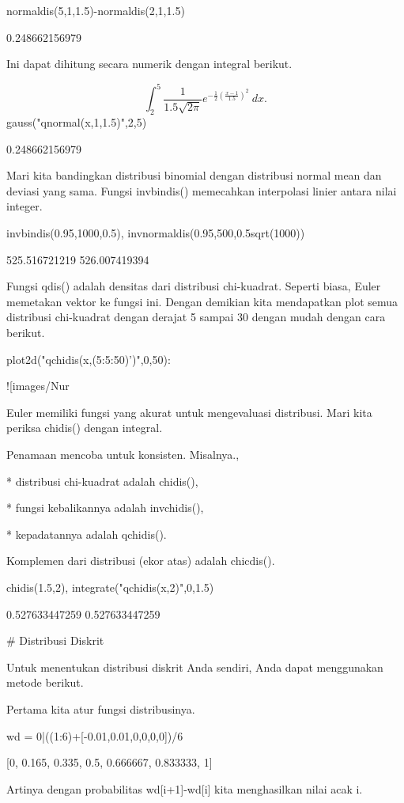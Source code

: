 \documentclass{article}
\begin{document}
\>normaldis(5,1,1.5)-normaldis(2,1,1.5)


    0.248662156979

Ini dapat dihitung secara numerik dengan integral berikut.


$$\int_2^5 \frac{1}{1.5\sqrt{2\pi}}e^{-\frac{1}{2}(\frac{x-1}{1.5})^2}\ dx.$$\>gauss("qnormal(x,1,1.5)",2,5)


    0.248662156979

Mari kita bandingkan distribusi binomial dengan distribusi normal mean
dan deviasi yang sama. Fungsi invbindis() memecahkan interpolasi
linier antara nilai integer.


\>invbindis(0.95,1000,0.5), invnormaldis(0.95,500,0.5\*sqrt(1000))


    525.516721219
    526.007419394

Fungsi qdis() adalah densitas dari distribusi chi-kuadrat. Seperti
biasa, Euler memetakan vektor ke fungsi ini. Dengan demikian kita
mendapatkan plot semua distribusi chi-kuadrat dengan derajat 5 sampai
30 dengan mudah dengan cara berikut.


\>plot2d("qchidis(x,(5:5:50)')",0,50):


![images/Nur%

Euler memiliki fungsi yang akurat untuk mengevaluasi distribusi. Mari
kita periksa chidis() dengan integral.


Penamaan mencoba untuk konsisten. Misalnya.,


* 
distribusi chi-kuadrat adalah chidis(),

* 
fungsi kebalikannya adalah invchidis(),

* 
kepadatannya adalah qchidis().


Komplemen dari distribusi (ekor atas) adalah chicdis().


\>chidis(1.5,2), integrate("qchidis(x,2)",0,1.5)


    0.527633447259
    0.527633447259

# Distribusi Diskrit

Untuk menentukan distribusi diskrit Anda sendiri, Anda dapat
menggunakan metode berikut.


Pertama kita atur fungsi distribusinya.


\>wd = 0|((1:6)+[-0.01,0.01,0,0,0,0])/6


    [0,  0.165,  0.335,  0.5,  0.666667,  0.833333,  1]

Artinya dengan probabilitas wd[i+1]-wd[i] kita menghasilkan nilai acak
i.
\end{document}
